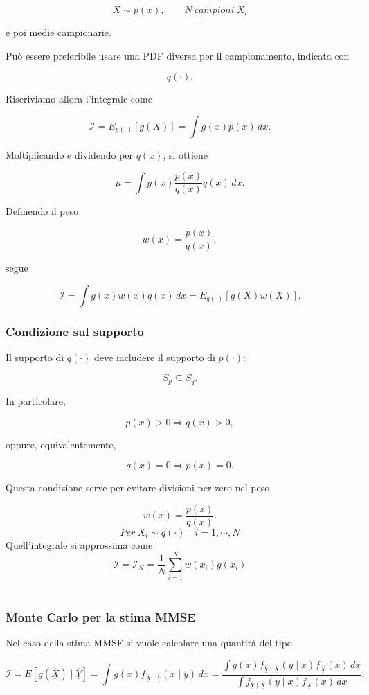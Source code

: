 \documentclass[11pt,a4paper]{article}
\begin{document}
\[
X \sim p(x),
\qquad N \ campioni \ X_i
\]

e poi medie campionarie. 


Può essere preferibile usare una PDF diversa per il campionamento, indicata con

\[
q(\cdot).
\]

Riscriviamo allora l'integrale come

\[
\mathcal{I}
=
E_{p(\cdot)}[g(X)]
=
\int g(x)p(x)\,dx.
\]

Moltiplicando e dividendo per \(q(x)\), si ottiene

\[
\mu
=
\int g(x)\frac{p(x)}{q(x)}q(x)\,dx.
\]

Definendo il peso

\[
w(x)=\frac{p(x)}{q(x)},
\]

segue

\[
\mathcal{I}
=
\int g(x)w(x)q(x)\,dx
=
E_{q(\cdot)}[g(X)w(X)].
\]

\subsubsection*{Condizione sul supporto}

Il supporto di \(q(\cdot)\) deve includere il supporto di \(p(\cdot)\):

\[
S_p \subseteq S_q.
\]

In particolare,

\[
p(x)>0 \Rightarrow q(x)>0,
\]

oppure, equivalentemente,

\[
q(x)=0 \Rightarrow p(x)=0.
\]

Questa condizione serve per evitare divisioni per zero nel peso

\[
w(x)=\frac{p(x)}{q(x)}.
\]
\[
Per \ X_i \sim q(\cdot) \quad i=1,\cdots,N
\]
Quell'integrale si approssima come
\[
\mathcal{I} = \mathcal{I}_N = \frac{1}{N}\sum_{i =1}^{N}w(x_i)g(x_i)
\]
\

\subsubsection*{Monte Carlo per la stima MMSE}

Nel caso della stima MMSE si vuole calcolare una quantità del tipo

\[
\mathcal{I}
=
E[g(\overline{\underline{X}})\mid \overline{\underline{Y}}] = \int g(x)f_{\overline{\underline{X}}\mid \overline{\underline{Y}}}(x\mid y)\,dx = \frac{
\displaystyle
\int g(x)f_{\overline{\underline{Y}}\mid \overline{\underline{X}}}(y\mid x)f_{\overline{\underline{X}}}(x)\,dx
}{
\displaystyle
\int f_{\overline{\underline{Y}}\mid \overline{\underline{X}}}(y\mid x)f_{\overline{\underline{X}}}(x)\,dx
}.
\]
\end{document}
